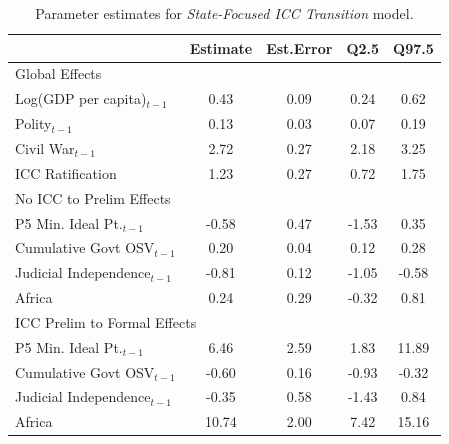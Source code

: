 \begin{table}[ht]
\centering
\begin{tabular}{lcccc}
  \hline\hline
 & Estimate & Est.Error & Q2.5 & Q97.5 \\
  \hline
  \multicolumn{4}{l}{Global Effects} \\
  Log(GDP per capita)$_{t-1}$ & 0.43 & 0.09 & 0.24 & 0.62 \\
  Polity$_{t-1}$ & 0.13 & 0.03 & 0.07 & 0.19 \\
  Civil War$_{t-1}$ & 2.72 & 0.27 & 2.18 & 3.25 \\
  ICC Ratification & 1.23 & 0.27 & 0.72 & 1.75 \\
  \hline
  \multicolumn{4}{l}{No ICC to Prelim Effects} \\
  P5 Min. Ideal Pt.$_{t-1}$ & -0.58 & 0.47 & -1.53 & 0.35 \\
  Cumulative Govt OSV$_{t-1}$ & 0.20 & 0.04 & 0.12 & 0.28 \\
  Judicial Independence$_{t-1}$ & -0.81 & 0.12 & -1.05 & -0.58 \\
  Africa & 0.24 & 0.29 & -0.32 & 0.81 \\
  \hline
  \multicolumn{4}{l}{ICC Prelim to Formal Effects} \\
  P5 Min. Ideal Pt.$_{t-1}$ & 6.46 & 2.59 & 1.83 & 11.89 \\
  Cumulative Govt OSV$_{t-1}$ & -0.60 & 0.16 & -0.93 & -0.32 \\
  Judicial Independence$_{t-1}$ & -0.35 & 0.58 & -1.43 & 0.84 \\
  Africa & 10.74 & 2.00 & 7.42 & 15.16 \\
   \hline\hline
\end{tabular}
\caption{Parameter estimates for \emph{State-Focused ICC Transition} model.}
\end{table}

